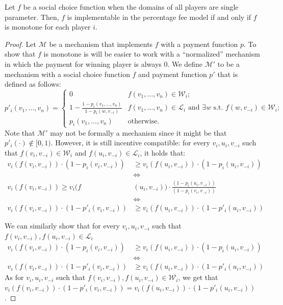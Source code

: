 \documentclass{theoretics}
\newcommand{\cM}{{\mathcal M}}
\begin{document}
\begin{theorem}
Let $f$ be a social choice function when the domains of all players are single parameter. Then, $f$ is implementable in the percentage fee model if and only if $f$ is monotone for each player $i$.
\end{theorem}
\begin{proof}
Let $\cM$ be a mechanism that implements $f$ with a payment function $p$. To show that $f$ is monotone is will be easier to work with a ``normalized'' mechanism in which the payment for winning player is always $0$. We define  $\cM'$ to be a mechanism with a social choice function $f$ and payment function $p'$ that is defined as follows:
$$
p'_i(v_1,\ldots, v_n)=
\begin{cases}
0 & f(v_1,\ldots, v_n)\in \mathcal W_i;\\
1-\frac {1-p_i(v_1,\ldots, v_n)} {1-p_i(w,v_{-i})} & f(v_1,\ldots, v_n)\in \mathcal L_i \text{ and $\exists w$ s.t. $f(w,v_{-i})\in \mathcal W_i$;}\\
p_i(v_1,\ldots, v_n) & \text{otherwise.}
\end{cases}
$$
Note that $\cM'$ may not be formally a mechanism since it might be that $p'_i(\cdot) \not\in [0,1)$. However, it is still incentive compatible: for every $v_i,u_i,v_{-i}$ such that $f(v_i,v_{-i}) \in \mathcal W_i$ and  $f(u_i,v_{-i}) \in \mathcal L_i$, it holds that:
\begin{align*}
	v_i(f(v_i,v_{-i}))\cdot (1-p_i(v_i,v_{-i})) &\geq v_i(f(u_i,v_{-i}))\cdot (1-p_i(u_i,v_{-i})) \\
	&\iff& \\
	v_i(f(v_i,v_{-i})) \geq v_i(f&(u_i,v_{-i}))\cdot \frac {(1-p_i(u_i,v_{-i}))} {(1-p_i(v_i,v_{-i}))} \\
	& \iff \\
	 v_i(f(v_i,v_{-i}))\cdot (1-p'_i(v_i,v_{-i})) &\geq v_i(f(u_i,v_{-i}))\cdot (1-p'_i(u_i,v_{-i}))
\end{align*}


  We can similarly show that for every $v_i,u_i,v_{-i}$ such that $f(v_i,v_{-i}) ,f(u_i,v_{-i}) \in \mathcal L_i$
\begin{align*}
v_i(f(v_i,v_{-i}))\cdot (1-p_i(v_i,v_{-i})) &\geq v_i(f(u_i,v_{-i}))\cdot (1-p_i(u_i,v_{-i})) 
\\ &\iff 
\\ v_i(f(v_i,v_{-i}))\cdot (1-p'_i(v_i,v_{-i})) &\geq v_i(f(u_i,v_{-i}))\cdot (1-p'_i(u_i,v_{-i}))
\end{align*}
As for $v_i,u_i,v_{-i}$ such that $f(v_i,v_{-i}) ,f(u_i,v_{-i}) \in \mathcal W_i$, we get that $v_i(f(v_i,v_{-i}))\cdot (1-p'_i(v_i,v_{-i})) = v_i(f(u_i,v_{-i}))\cdot (1-p'_i(u_i,v_{-i}))$.


\end{proof}
\end{document}
